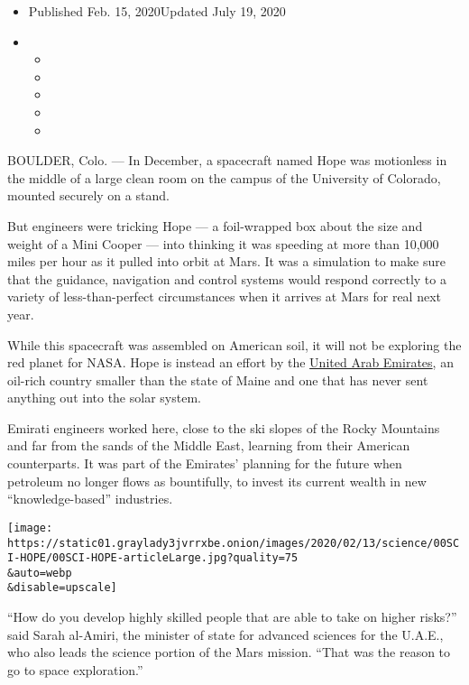 \begin{itemize}
\item
  Published Feb. 15, 2020Updated July 19, 2020
\item
  \begin{itemize}
  \item
  \item
  \item
  \item
  \item
  \end{itemize}
\end{itemize}

BOULDER, Colo. --- In December, a spacecraft named Hope was motionless
in the middle of a large clean room on the campus of the University of
Colorado, mounted securely on a stand.

But engineers were tricking Hope --- a foil-wrapped box about the size
and weight of a Mini Cooper --- into thinking it was speeding at more
than 10,000 miles per hour as it pulled into orbit at Mars. It was a
simulation to make sure that the guidance, navigation and control
systems would respond correctly to a variety of less-than-perfect
circumstances when it arrives at Mars for real next year.

While this spacecraft was assembled on American soil, it will not be
exploring the red planet for NASA. Hope is instead an effort by the
\href{https://www.nytimes3xbfgragh.onion/2020/07/14/science/mars-united-arab-emirates.html}{United
Arab Emirates}, an oil-rich country smaller than the state of Maine and
one that has never sent anything out into the solar system.

Emirati engineers worked here, close to the ski slopes of the Rocky
Mountains and far from the sands of the Middle East, learning from their
American counterparts. It was part of the Emirates' planning for the
future when petroleum no longer flows as bountifully, to invest its
current wealth in new ``knowledge-based'' industries.

\texttt{[image: https://static01.graylady3jvrrxbe.onion/images/2020/02/13/science/00SCI-HOPE/00SCI-HOPE-articleLarge.jpg?quality=75\\\&auto=webp\\\&disable=upscale]}

``How do you develop highly skilled people that are able to take on
higher risks?'' said Sarah al-Amiri, the minister of state for advanced
sciences for the U.A.E., who also leads the science portion of the Mars
mission. ``That was the reason to go to space exploration.''


